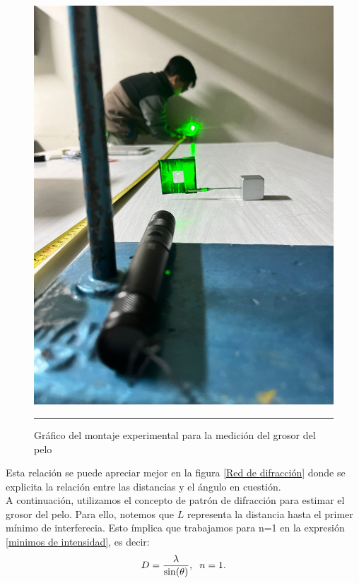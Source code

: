 \documentclass[10pt,a4paper]{article}
\begin{document}
\begin{multicols}{2}
		\begin{figure}[H]
		\centering
		\includegraphics[scale=0.1]{Pelo.jpeg}
		\caption{Gráfico del montaje experimental para la medición del grosor del pelo }
		\label{Grafico medición}
		\rule{80mm}{0.1mm}
	\end{figure}
	
		Esta relación se puede apreciar mejor en la figura \ref{Red de difracción} donde se explicita la relación entre las distancias y el ángulo en cuestión.\\
		A continuación, utilizamos el concepto de patrón de difracción para estimar el grosor del pelo. Para ello, notemos que $L$ representa la distancia hasta el primer mínimo de interferecia. Esto ímplica que trabajamos para n=1 en la expresión \ref{minimos de intensidad}, es decir:
		\begin{equation} \label{minimo de intensidad para n=1}
		D = \frac{\lambda}{\sin(\theta)}, \hspace{2mm} n = 1.
		\end{equation}
		

\end{multicols}
\end{document}
